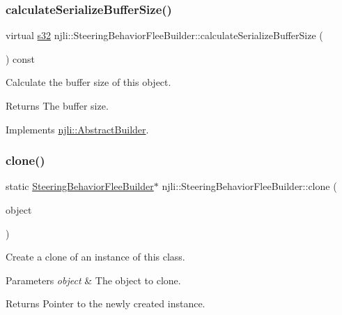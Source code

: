 \subsubsection{\texorpdfstring{calculate\+Serialize\+Buffer\+Size()}{calculateSerializeBufferSize()}}
{\footnotesize\ttfamily virtual \mbox{\hyperlink{_util_8h_aa62c75d314a0d1f37f79c4b73b2292e2}{s32}} njli\+::\+Steering\+Behavior\+Flee\+Builder\+::calculate\+Serialize\+Buffer\+Size (\begin{DoxyParamCaption}{ }\end{DoxyParamCaption}) const\hspace{0.3cm}{\ttfamily [virtual]}}

Calculate the buffer size of this object.

\begin{DoxyReturn}{Returns}
The buffer size. 
\end{DoxyReturn}


Implements \mbox{\hyperlink{classnjli_1_1_abstract_builder_aa1d220053e182c37b31b427499c6eacf}{njli\+::\+Abstract\+Builder}}.

\mbox{\label{classnjli_1_1_steering_behavior_flee_builder_a9f6f2314203a85906d3d0120e210642d}} 
\subsubsection{\texorpdfstring{clone()}{clone()}}
{\footnotesize\ttfamily static \mbox{\hyperlink{classnjli_1_1_steering_behavior_flee_builder}{Steering\+Behavior\+Flee\+Builder}}$\ast$ njli\+::\+Steering\+Behavior\+Flee\+Builder\+::clone (\begin{DoxyParamCaption}\item[{const \mbox{\hyperlink{classnjli_1_1_steering_behavior_flee_builder}{Steering\+Behavior\+Flee\+Builder}} \&}]{object }\end{DoxyParamCaption})\hspace{0.3cm}{\ttfamily [static]}}

Create a clone of an instance of this class.


\begin{DoxyParams}{Parameters}
{\em object} & The object to clone.\\
\hline
\end{DoxyParams}
\begin{DoxyReturn}{Returns}
Pointer to the newly created instance. 
\end{DoxyReturn}
\mbox{\label{classnjli_1_1_steering_behavior_flee_builder_ac6cc0482c2b9d77d61468ccaacf665ff}} 
